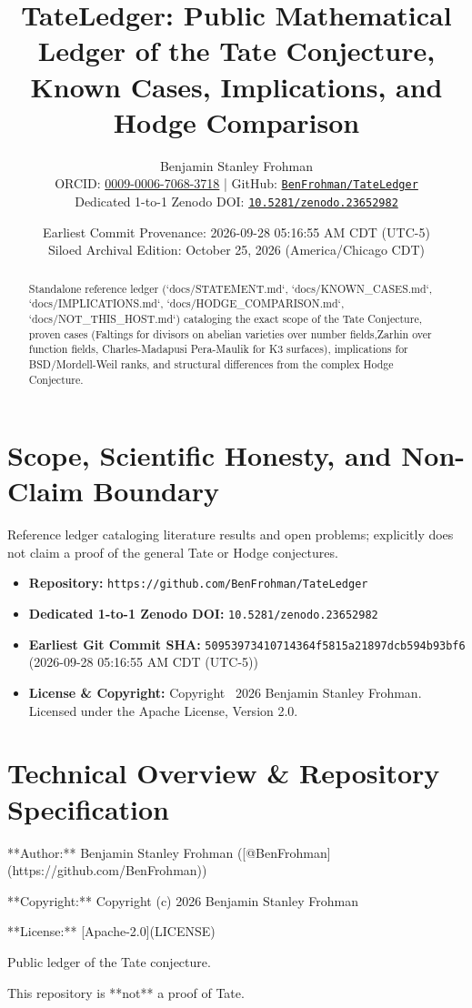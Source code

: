 \documentclass[11pt,a4paper]{article}
\title{\textbf{TateLedger: Public Mathematical Ledger of the Tate Conjecture, Known Cases, Implications, and Hodge Comparison}}
\author{Benjamin Stanley Frohman\\
\small ORCID: \href{https://orcid.org/0009-0006-7068-3718}{0009-0006-7068-3718} \quad|\quad
GitHub: \href{https://github.com/BenFrohman/TateLedger}{\texttt{BenFrohman/TateLedger}}\\
\small Dedicated 1-to-1 Zenodo DOI: \href{https://doi.org/10.5281/zenodo.23652982}{\texttt{10.5281/zenodo.23652982}}}
\date{Earliest Commit Provenance: 2026-09-28 05:16:55 AM CDT (UTC-5)\\
Siloed Archival Edition: October 25, 2026 (America/Chicago CDT)}
\begin{document}
\maketitle

\begin{abstract}
Standalone reference ledger (`docs/STATEMENT.md`, `docs/KNOWN\_CASES.md`, `docs/IMPLICATIONS.md`, `docs/HODGE\_COMPARISON.md`, `docs/NOT\_THIS\_HOST.md`) cataloging the exact scope of the Tate Conjecture, proven cases (Faltings for divisors on abelian varieties over number fields,Zarhin over function fields, Charles-Madapusi Pera-Maulik for K3 surfaces), implications for BSD/Mordell-Weil ranks, and structural differences from the complex Hodge Conjecture.
\end{abstract}

\section{Scope, Scientific Honesty, and Non-Claim Boundary}
Reference ledger cataloging literature results and open problems; explicitly does not claim a proof of the general Tate or Hodge conjectures.

\begin{itemize}
  \item \textbf{Repository:} \texttt{https://github.com/BenFrohman/TateLedger}
  \item \textbf{Dedicated 1-to-1 Zenodo DOI:} \texttt{10.5281/zenodo.23652982}
  \item \textbf{Earliest Git Commit SHA:} \texttt{50953973410714364f5815a21897dcb594b93bf6} (2026-09-28 05:16:55 AM CDT (UTC-5))
  \item \textbf{License \& Copyright:} Copyright \textcopyright\ 2026 Benjamin Stanley Frohman. Licensed under the Apache License, Version 2.0.
\end{itemize}

\section{Technical Overview \& Repository Specification}
**Author:** Benjamin Stanley Frohman ([@BenFrohman](https://github.com/BenFrohman))

**Copyright:** Copyright (c) 2026 Benjamin Stanley Frohman

**License:** [Apache-2.0](LICENSE)

Public ledger of the Tate conjecture.

This repository is **not** a proof of Tate.
\end{document}
